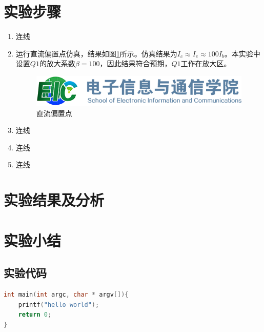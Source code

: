 \documentclass[12pt]{article}
\begin{document}
\section{实验步骤}

\begin{enumerate}
	\item 连线
	\item 运行直流偏置点仿真，结果如图\ref{fig:simdc}所示。仿真结果为$I_c \approx I_e \approx 100I_b$。本实验中设置$Q1$的放大系数$\beta=100$，因此结果符合预期，$Q1$工作在放大区。

\begin{figure}[htbp]
	\centering
	\includegraphics[scale=0.3]{figures/logo-hust-eic.png}
	\caption{直流偏置点}
	\label{fig:simdc}
\end{figure}

	\item 连线
	\item 连线
	\item 连线
\end{enumerate}
	

\section{实验结果及分析}

\section{实验小结}


\begin{appendices}

\section{实验代码}
% 
\begin{lstlisting}[language=C]
int main(int argc, char * argv[]){
    printf("hello world");
    return 0;
}
\end{lstlisting}
\end{appendices}
\end{document}
